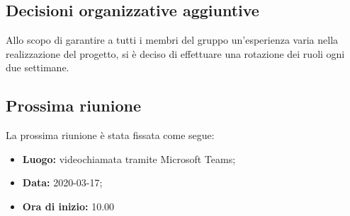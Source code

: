 \subsection{Decisioni organizzative aggiuntive}
Allo scopo di garantire a tutti i membri del gruppo un'esperienza varia nella realizzazione del progetto, si è deciso di effettuare una rotazione dei ruoli ogni due settimane.
 

\subsection{Prossima riunione}
La prossima riunione è stata fissata come segue: 
\begin{itemize}
	\item \textbf{Luogo: } videochiamata tramite Microsoft Teams; 
	\item \textbf{Data: } 2020-03-17; 
	\item \textbf{Ora di inizio: } 10.00
\end{itemize}